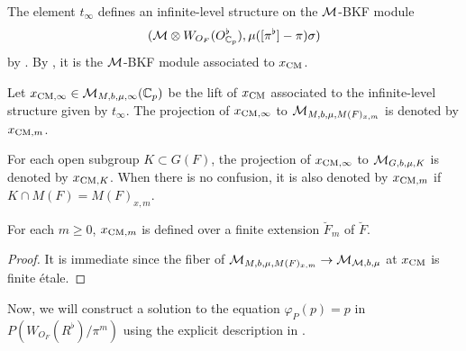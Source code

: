 \documentclass[12pt,reqno]{amsart}
\begin{document}
The element $t_\infty$ defines an infinite-level structure on the ${\mathcal{M}}$-BKF module
\[
    ({\mathcal{M}} \otimes W_{O_F}(O_{\mathbb{C}_p}^\flat), \mu([\pi^\flat]-\pi)\sigma)
\]
by . By , it is the ${\mathcal{M}}$-BKF module associated to $x_{\operatorname{CM}}$. 

\begin{defi} \label{defi:CM_points_in_LSV}
    Let $x_{{\operatorname{CM}}, \infty} \in {\mathcal{M}}_{M, b, \mu, \infty}(\mathbb{C}_p)$ be the lift of $x_{\operatorname{CM}}$ associated to the infinite-level structure given by $t_\infty$. The projection of $x_{{\operatorname{CM}}, \infty}$ to ${\mathcal{M}}_{M, b, \mu, M(F)_{x, m}}$ is denoted by $x_{{\operatorname{CM}}, m}$. 
\end{defi}

For each open subgroup $K \subset G(F)$, the projection of $x_{{\operatorname{CM}}, \infty}$ to ${\mathcal{M}}_{G, b, \mu, K}$ is denoted by $x_{{\operatorname{CM}}, K}$. When there is no confusion, it is also denoted by $x_{{\operatorname{CM}}, m}$ if $K \cap M(F) = M(F)_{x, m}$. 

\begin{lem}
    For each $m \geq 0$, $x_{{\operatorname{CM}}, m}$ is defined over a finite extension $\breve{F}_m$ of $\breve{F}$. 
\end{lem}
\begin{proof}
    It is immediate since the fiber of ${\mathcal{M}}_{M, b, \mu, M(F)_{x, m}} \to {\mathcal{M}}_{{\mathcal{M}}, b, \mu}$ at $x_{{\operatorname{CM}}}$ is finite \'{e}tale. 
\end{proof}

Now, we will construct a solution to the equation $\varphi_P(p) = p$ in $P(W_{O_F}(R^\flat)/\pi^m)$ using the explicit description in . 
\end{document}

